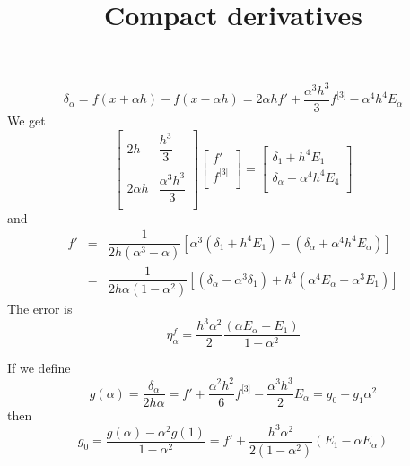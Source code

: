 \documentclass[aps,10pt]{revtex4}
\newcommand{\drvs}[2]{{#1}^{\lbrack #2 \rbrack}}
\begin{document}
\title{Compact derivatives}
\maketitle

\begin{equation}
	\delta_\alpha = f(x+\alpha h) - f(x-\alpha h) = 2 \alpha h f' + \dfrac{\alpha^3h^3}{3} \drvs{f}{3}  - \alpha^4 h^4 E_\alpha
\end{equation}
We get
\begin{equation}
\begin{bmatrix}
2h & \dfrac{h^3}{3}\\
\\
2\alpha h & \dfrac{\alpha^3h^3}{3}\\
\end{bmatrix}
\begin{bmatrix}
f'\\
\drvs{f}{3}\\
\end{bmatrix}
=
\begin{bmatrix}
	\delta_1 + h^4 E_1\\
	\delta_\alpha + \alpha^4 h^4 E_4\\
\end{bmatrix}
\end{equation}
and
\begin{equation}
\begin{array}{rcl}
	f' & = &\dfrac{1}{2h(\alpha^3-\alpha)}\left[ \alpha^3 (\delta_1+h^4 E_1) - (\delta_\alpha+\alpha^4h^4 E_\alpha) \right]\\
	   & = &\dfrac{1}{2h\alpha(1-\alpha^2)}\left[ (\delta_\alpha - \alpha^3 \delta_1) + h^4 \left( \alpha^4 E_\alpha - \alpha^3 E_1 \right)\right]
\end{array}
\end{equation}
The error is
\begin{equation}
	\eta_\alpha^f =  \dfrac{h^3\alpha^2}{2} \dfrac{\left( \alpha  E_\alpha -  E_1 \right)}{1-\alpha^2}
\end{equation}

If we define
\begin{equation}
	g(\alpha) = \dfrac{\delta_\alpha}{2h\alpha} = f' + \dfrac{\alpha^2h^2}{6} \drvs{f}{3}  - \dfrac{\alpha^3 h^3}{2} E_\alpha = g_0 + g_1 \alpha^2
\end{equation}
then
\begin{equation}
	g_0 = \dfrac{g(\alpha)-\alpha^2g(1)}{1-\alpha^2} = f' + \dfrac{h^3\alpha^2}{2(1-\alpha^2)}\left( E_1 - \alpha  E_\alpha \right)
\end{equation}
\end{document}
